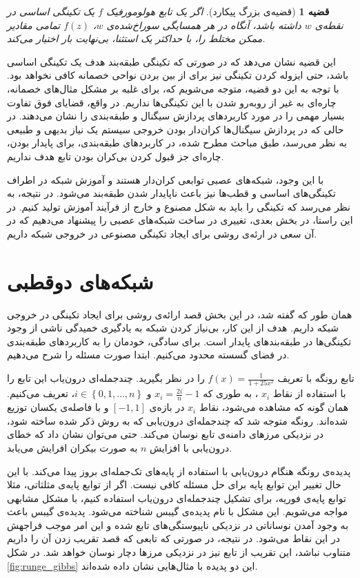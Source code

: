 \documentclass[12pt,onecolumn,a4paper]{article}
\newtheorem{theorem}{قضیه}[section]
\begin{document}
\begin{theorem}[قضیه‌ی بزرگ پیکارد]
    اگر یک تابع هولومورفیک $f$ 
    یک تکینگی اساسی در نقطه‌ی $w$ 
    داشته باشد، آنگاه در هر همسایگی سوراخ‌شده‌ی $w$، $f(z)$ 
    تمامی مقادیر ممکن مختلط را، با حداکثر یک استثنا، بی‌نهایت بار اختیار می‌کند.
\end{theorem}

این قضیه نشان می‌دهد که در صورتی که تکینگی طبقه‌بند هدف یک تکینگی اساسی باشد، حتی ایزوله کردن تکینگی نیز برای از بین بردن نواحی خصمانه کافی نخواهد بود. با توجه به این دو قضیه، متوجه می‌شویم که، برای غلبه بر مشکل مثال‌های خصمانه، چاره‌ای به غیر از روبه‌رو شدن با این تکینگی‌ها نداریم. در واقع، قضایای فوق تفاوت بسیار مهمی را در مورد کاربردهای پردازش سیگنال و طبقه‌بندی را نشان می‌دهند. در حالی که در پردازش سیگنال‌ها کران‌دار بودن خروجی سیستم یک نیاز بدیهی و طبیعی به نظر می‌رسد، طبق مباحث مطرح شده، در کاربردهای طبقه‌بندی، برای پایدار بودن، چاره‌ای جز قبول کردن بی‌کران بودن تابع هدف نداریم. 

با این وجود، شبکه‌های عصبی توابعی کران‌دار هستند و آموزش شبکه در اطراف تکینگی‌های اساسی و قطب‌ها نیز باعث ناپایدار شدن طبقه‌بند می‌شود. در نتیجه، به نظر می‌رسد که تکینگی را باید به شکل مصنوع و خارج از فرآیند آموزش تولید کنیم. در این راستا، در بخش بعدی، تغییری در ساخت شبکه‌های عصبی را پیشنهاد می‌دهیم که در آن سعی در ارئه‌ی روشی برای ایجاد تکینگی مصنوعی در خروجی شبکه داریم.

\section{شبکه‌های دوقطبی}
همان طور که گفته شد، در این بخش قصد ارائه‌ی روشی برای ایجاد تکینگی در خروجی شبکه داریم. هدف از این کار، بی‌نیاز کردن شبکه به یادگیری خمیدگی ناشی از وجود تکینگی‌ها در طبقه‌بندهای پایدار است. برای سادگی، خودمان را به کاربردهای طبقه‌بندی در فضای گسسته محدود می‌کنیم. ابتدا صورت مسئله را شرح می‌دهیم.

تابع رونگه با تعریف 
$f(x)=\frac{1}{1+25x^2}$ 
را در نظر بگیرید. چندجمله‌ای درون‌یاب این تابع را با استفاده از نقاط 
$x_i$ 
، به طوری که
$x_{i}=\frac{2i}{n}-1$ 
و 
$i\in \left\{0,1,\dots ,n\right\}$،
تعریف می‌کنیم.
همان گونه که مشاهده می‌شود، نقاط 
$x_i$ 
در بازه‌ی 
$[-1,1]$ 
و با فاصله‌ی یکسان توزیع شده‌اند. رونگه متوجه شد که چندجمله‌ای درون‌یابی که به روش ذکر شده ساخته شود، در نزدیکی مرز‌های دامنه‌ی تابع نوسان می‌کند. حتی می‌توان نشان داد که خطای درون‌یابی با افزایش 
$n$ 
 به صورت بیکران افرایش می‌یابد.

پدیده‌ی رونگه هنگام درون‌یابی با استفاده از پایه‌های تک‌جمله‌ای 
بروز پیدا می‌کند. با این حال تغییر این توابع پایه برای حل مسئله کافی نیست. اگر از توابع پایه‌ی مثلثاتی، مثلا توابع پایه‌ی فوریه، برای تشکیل چندجمله‌ای درون‌یاب استفاده کنیم، با مشکل مشابهی مواجه می‌شویم. این مشکل  با نام پدیده‌ی گیبس
شناخته می‌شود. پدیده‌ی گیبس باعث به وجود آمدن نوساناتی در نزدیکی ناپیوستگی‌های تابع شده و این امر موجب فراجهش
در این نقاط می‌شود. در نتیجه، در صورتی که تابعی که قصد تقریب زدن آن را داریم متناوب نباشد، این تقریب از تابع نیز در نزدیکی مرزها دچار نوسان خواهد شد. در شکل 
\ref{fig:runge_gibbs} 
این دو پدیده با مثال‌هایی نشان داده‌ شده‌اند.
\end{document}
